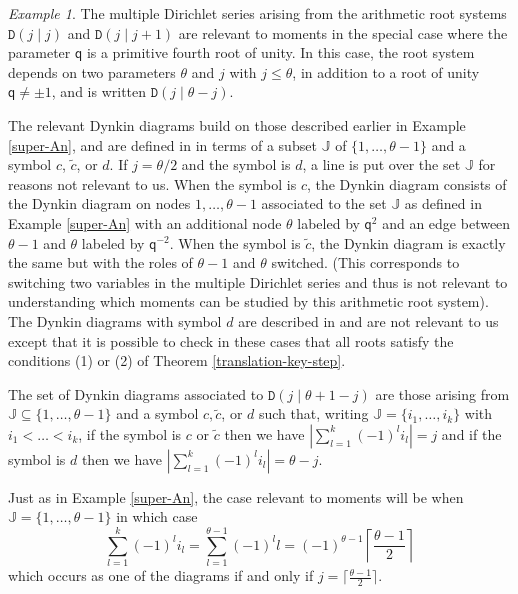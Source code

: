 \documentclass[11pt,letterpaper]{article}
\theoremstyle{definition}
\theoremstyle{remark}
\newtheorem{example}[theorem]{Example}
\numberwithin{equation}{section}
\theoremstyle{dotless}
\newcommand{\qq}{\mathbf{ \mathsf{q}}} %
\renewcommand{\tilde}{\widetilde}
\begin{document}
\begin{example} \label{new-example-3} The multiple Dirichlet series arising from the arithmetic root systems $\mathtt D(j \mid j)$ and $\mathtt D(j \mid j+1)$ are relevant to moments in the special case where the parameter $\qq$ is a primitive fourth root of unity. In this case, the root system depends on two parameters $\theta$ and $j$ with $j \leq \theta$, in addition to a root of unity $\qq\neq \pm 1$,  and is written $\mathtt D(j\mid \theta-j)$.

The relevant Dynkin diagrams build on those described earlier in Example \ref{super-An}, and are defined in \cite[\S5.3.9 and \S5.3.10]{AndruskiewitschAngiono} in terms of a subset $\mathbb J$ of $\{1,\dots, \theta-1\}$ and a symbol $c$, $\tilde{c}$, or $d$. If $j = \theta/2$ and the symbol is $d$, a line is put over the set $\mathbb J$ for reasons not relevant to us. When the symbol is $c$, the Dynkin diagram consists of the Dynkin diagram on nodes $1,\dots, \theta-1$ associated to the set $\mathbb J$ as defined in Example \ref{super-An} with an additional node $\theta$ labeled by $\qq^2$ and an edge between $\theta-1$ and $\theta$ labeled by $\qq^{-2}$. When the symbol is $\tilde{c}$, the Dynkin diagram is exactly the same but with the roles of $\theta-1$ and $\theta$ switched. (This corresponds to switching two variables in the multiple Dirichlet series and thus is not relevant to understanding which moments can be studied by this arithmetic root system). The Dynkin diagrams with symbol $d$ are described in \cite[(5.25) and (5.26)]{AndruskiewitschAngiono} and are not relevant to us except that it is possible to check in these cases that all roots satisfy the conditions (1) or (2) of Theorem \ref{translation-key-step}. 



The set of Dynkin diagrams associated to $\mathtt D(j\mid \theta+1-j)$ are those arising from $\mathbb J  \subseteq \{1,\dots, \theta-1\}$ and a symbol $c, \tilde{c}$, or $d$ such that, writing $\mathbb J = \{i_1,\dots, i_k\}$ with $i_1< \dots < i_k$, if the symbol is $c$ or $\tilde{c}$ then we have  $ \left| \sum_{l=1}^k (-1)^l i_l\right|=j$ and if the symbol is $d$ then we have $ \left| \sum_{l=1}^k (-1)^l i_l\right|=\theta-j$.

 Just as in Example \ref{super-An}, the case relevant to moments will be when  $\mathbb J = \{1,\dots,\theta-1\}$  in which case \[  \sum_{l=1}^k (-1)^l i_l = \sum_{l=1}^{\theta-1} (-1)^l l = (-1)^{\theta-1} \left\lceil \frac{\theta-1 }{2} \right\rceil \] which occurs as one of the diagrams if and only if $j = \lceil \frac{\theta-1}{2} \rceil $.


\end{example}
\end{document}

